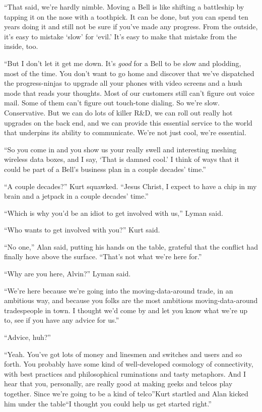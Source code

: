 ``That said, we're hardly nimble.  Moving a Bell is like shifting a
battleship by tapping it on the nose with a toothpick.  It can be
done, but you can spend ten years doing it and still not be sure if
you've made any progress.  From the outside, it's easy to mistake
`slow' for `evil.' It's easy to make that mistake from the inside,
too.

``But I don't let it get me down.  It's \textit{good} for a Bell to be
slow and plodding, most of the time.  You don't want to go home and
discover that we've dispatched the progress-ninjas to upgrade all your
phones with video screens and a hush mode that reads your thoughts. 
Most of our customers still can't figure out voice mail.  Some of them
can't figure out touch-tone dialing.  So we're slow.  Conservative. 
But we can do lots of killer R\&D, we can roll out really hot
upgrades on the back end, and we can provide this essential service to
the world that underpins its ability to communicate.  We're not just
cool, we're essential.

``So you come in and you show us your really swell and interesting
meshing wireless data boxes, and I say, `That is damned cool.' I think
of ways that it could be part of a Bell's business plan in a couple
decades' time.''

``A couple decades?'' Kurt squawked.  ``Jesus Christ, I expect to have
a chip in my brain and a jetpack in a couple decades' time.''

``Which is why you'd be an idiot to get involved with us,'' Lyman
said.

``Who wants to get involved with you?'' Kurt said.

``No one,'' Alan said, putting his hands on the table, grateful that
the conflict had finally hove above the surface.  ``That's not what
we're here for.''

``Why are you here, Alvin?'' Lyman said.

``We're here because we're going into the moving-data-around trade, in
an ambitious way, and because you folks are the most ambitious
moving-data-around tradespeople in town.  I thought we'd come by and
let you know what we're up to, see if you have any advice for us.''

``Advice, huh?''

``Yeah.  You've got lots of money and linesmen and switches and users
and so forth.  You probably have some kind of well-developed cosmology
of connectivity, with best practices and philosophical ruminations and
tasty metaphors.  And I hear that you, personally, are really good at
making geeks and telcos play together.  Since we're going to be a kind
of telco''\dash{}Kurt startled and Alan kicked him under the table\dash{}``I
thought you could help us get started right.''

